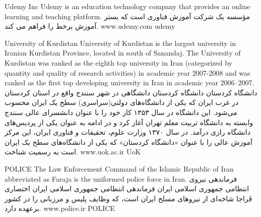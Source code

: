 \instituteC
{Udemy Inc}
{Udemy is an education technology company that provides an online learning and teaching platform.}
{}
{مؤسسه }
{یک شرکت آموزش فناوری است که بستر آموزش برخط را فراهم می کند.}
{}
{www.udemy.com}
{udemy}

\instituteC
{University of Kurdistan}
{University of Kurdistan is the largest university in Iranian Kurdistan Province, located in south of Sanandaj.
The University of Kurdistan was ranked as the eighth top university in Iran (categorized by quantity and quality of research activities)
in academic year 2007-2008 and was ranked as the first top developing university in Iran in academic year 2006–2007.}
{}
{دانشگاه كردستان}
{دانشگاه کردستان دانشگاهی در شهر سنندج واقع در استان کردستان در غرب ایران که یکی از دانشگاه‌های دولتی(سراسری) سطح یک ایران محسوب می‌شود.
این دانشگاه در سال ۱۳۵۳ کار خود را با عنوان دانشسرای عالی سنندج وابسته به دانشگاه تربیت معلم تهران آغاز کرد و در ادامه به عنوان یکی از پردیس‌های دانشگاه رازی درآمد.
در سال ۱۳۷۰ وزارت علوم، تحقیقات و فناوری ایران، این مرکز آموزش عالی را با عنوان «دانشگاه کردستان» که یکی از دانشگاه‌های سطح یک ایران است به رسمیت شناخت.}
{}
{www.uok.ac.ir}
{UoK}

\instituteC
{POLICE}
{The Law Enforcement Command of the Islamic Republic of Iran abbreviated as Faraja is the uniformed police force in Iran.}
{}
{فرماندهی نیروی انتظامی جمهوری اسلامی ایران}
{فرماندهی انتظامی جمهوری اسلامی ایران اختصاری فَراجا شاخه‌ای از نیروهای مسلح ایران است، که وظایف پلیس و مرزبانی را در کشور برعهده دارد.}
{}
{www.police.ir}
{POLICE}
